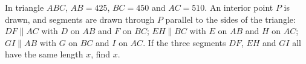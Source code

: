 In triangle $ABC$, $AB=425$, $BC=450$ and $AC=510$. An interior point $P$ is drawn, and segments are drawn through $P$ parallel to the sides of the triangle: $DF\parallel AC$ with $D$ on $AB$ and $F$ on $BC$; $EH\parallel BC$ with $E$ on $AB$ and $H$ on $AC$; $GI\parallel AB$ with $G$ on $BC$ and $I$ on $AC$. If the three segments $DF$, $EH$ and $GI$ all have the same length $x$, find $x$.
